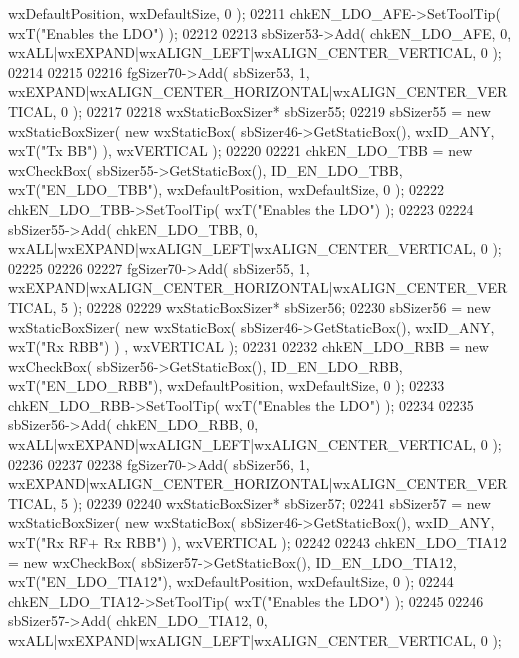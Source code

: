 \begin{DoxyCode}
      wxDefaultPosition, wxDefaultSize, 0 );
02211     chkEN_LDO_AFE->SetToolTip( wxT(\textcolor{stringliteral}{"Enables the LDO"}) );
02212     
02213     sbSizer53->Add( chkEN_LDO_AFE, 0, wxALL|wxEXPAND|wxALIGN\_LEFT|wxALIGN\_CENTER\_VERTICAL, 0 );
02214     
02215     
02216     fgSizer70->Add( sbSizer53, 1, wxEXPAND|wxALIGN\_CENTER\_HORIZONTAL|wxALIGN\_CENTER\_VERTICAL, 0 );
02217     
02218     wxStaticBoxSizer* sbSizer55;
02219     sbSizer55 = \textcolor{keyword}{new} wxStaticBoxSizer( \textcolor{keyword}{new} wxStaticBox( sbSizer46->GetStaticBox(), wxID\_ANY, wxT(\textcolor{stringliteral}{"Tx BB"}) ),
       wxVERTICAL );
02220     
02221     chkEN_LDO_TBB = \textcolor{keyword}{new} wxCheckBox( sbSizer55->GetStaticBox(), ID_EN_LDO_TBB, wxT(\textcolor{stringliteral}{"EN\_LDO\_TBB"}), 
      wxDefaultPosition, wxDefaultSize, 0 );
02222     chkEN_LDO_TBB->SetToolTip( wxT(\textcolor{stringliteral}{"Enables the LDO"}) );
02223     
02224     sbSizer55->Add( chkEN_LDO_TBB, 0, wxALL|wxEXPAND|wxALIGN\_LEFT|wxALIGN\_CENTER\_VERTICAL, 0 );
02225     
02226     
02227     fgSizer70->Add( sbSizer55, 1, wxEXPAND|wxALIGN\_CENTER\_HORIZONTAL|wxALIGN\_CENTER\_VERTICAL, 5 );
02228     
02229     wxStaticBoxSizer* sbSizer56;
02230     sbSizer56 = \textcolor{keyword}{new} wxStaticBoxSizer( \textcolor{keyword}{new} wxStaticBox( sbSizer46->GetStaticBox(), wxID\_ANY, wxT(\textcolor{stringliteral}{"Rx RBB"}) )
      , wxVERTICAL );
02231     
02232     chkEN_LDO_RBB = \textcolor{keyword}{new} wxCheckBox( sbSizer56->GetStaticBox(), ID_EN_LDO_RBB, wxT(\textcolor{stringliteral}{"EN\_LDO\_RBB"}), 
      wxDefaultPosition, wxDefaultSize, 0 );
02233     chkEN_LDO_RBB->SetToolTip( wxT(\textcolor{stringliteral}{"Enables the LDO"}) );
02234     
02235     sbSizer56->Add( chkEN_LDO_RBB, 0, wxALL|wxEXPAND|wxALIGN\_LEFT|wxALIGN\_CENTER\_VERTICAL, 0 );
02236     
02237     
02238     fgSizer70->Add( sbSizer56, 1, wxEXPAND|wxALIGN\_CENTER\_HORIZONTAL|wxALIGN\_CENTER\_VERTICAL, 5 );
02239     
02240     wxStaticBoxSizer* sbSizer57;
02241     sbSizer57 = \textcolor{keyword}{new} wxStaticBoxSizer( \textcolor{keyword}{new} wxStaticBox( sbSizer46->GetStaticBox(), wxID\_ANY, wxT(\textcolor{stringliteral}{"Rx RF+ Rx
       RBB"}) ), wxVERTICAL );
02242     
02243     chkEN_LDO_TIA12 = \textcolor{keyword}{new} wxCheckBox( sbSizer57->GetStaticBox(), ID_EN_LDO_TIA12, wxT(\textcolor{stringliteral}{"EN\_LDO\_TIA12"}), 
      wxDefaultPosition, wxDefaultSize, 0 );
02244     chkEN_LDO_TIA12->SetToolTip( wxT(\textcolor{stringliteral}{"Enables the LDO"}) );
02245     
02246     sbSizer57->Add( chkEN_LDO_TIA12, 0, wxALL|wxEXPAND|wxALIGN\_LEFT|wxALIGN\_CENTER\_VERTICAL, 0 );

\end{DoxyCode}
